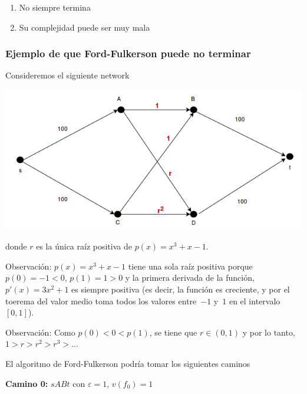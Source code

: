\documentclass[10pt,a4paper]{article}
\begin{document}
\begin{enumerate}

	\item No siempre termina
	\item Su complejidad puede ser muy mala
\end{enumerate}

\subsubsection*{Ejemplo de que Ford-Fulkerson puede no terminar}

Consideremos el siguiente network

\begin{center}

    \begin{adjustbox}{max size={\textwidth}{\textheight}}
        \includegraphics{definitions/ff_problem_1.png}
        \end{adjustbox}
     
\end{center}

donde $r$ es la única raíz positiva de $p(x) = x^3+x -1$.

Observación: $p(x) = x^3 + x - 1$ tiene una sola raíz positiva porque $p(0) = -1 < 0$, $p(1) = 1>0$ y la primera derivada de la función, $p' (x) = 3x^2+1$ es siempre positiva (es decir, la función es creciente, y por el toerema del valor medio toma todos los valores entre $-1$ y $1$ en el intervalo $[0, 1]$).

Observación: Como $p(0) < 0 < p(1)$, se tiene que $r \in (0, 1)$ y por lo tanto, $1 > r > r^2 > r^3 > \dots$

El algoritmo de Ford-Fulkerson podría tomar los siguientes caminos

\textbf{Camino 0: }$sABt$ con $\varepsilon = 1$, $v(f_0) = 1$
\end{document}
